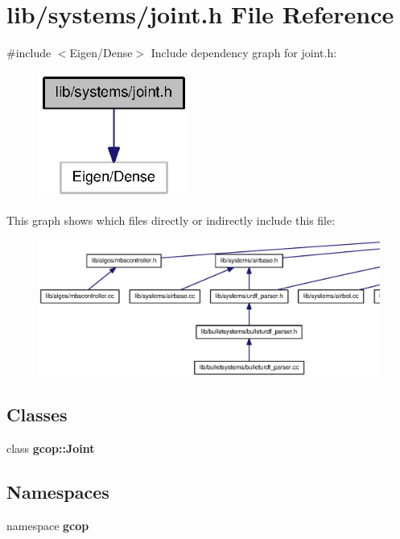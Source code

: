 \section{lib/systems/joint.h \-File \-Reference}
\label{joint_8h}
{\ttfamily \#include $<$\-Eigen/\-Dense$>$}\*
\-Include dependency graph for joint.\-h\-:
\nopagebreak
\begin{figure}[H]
\begin{center}
\leavevmode
\includegraphics[width=140pt]{joint_8h__incl}
\end{center}
\end{figure}
\-This graph shows which files directly or indirectly include this file\-:
\nopagebreak
\begin{figure}[H]
\begin{center}
\leavevmode
\includegraphics[width=350pt]{joint_8h__dep__incl}
\end{center}
\end{figure}
\subsection*{\-Classes}
\begin{DoxyCompactItemize}
\item 
class {\bf gcop\-::\-Joint}
\end{DoxyCompactItemize}
\subsection*{\-Namespaces}
\begin{DoxyCompactItemize}
\item 
namespace {\bf gcop}
\end{DoxyCompactItemize}
